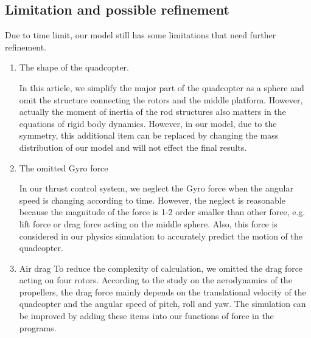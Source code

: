\subsection{Limitation and possible refinement}
    Due to time limit, our model still has some limitations that need further refinement.
\begin{enumerate}
    \item The shape of the quadcopter.
    
    In this article, we simplify the major part of the quadcopter as a sphere and omit the structure connecting the rotors and the middle platform. However, actually the moment of inertia of the rod structures also matters in the equations of rigid body dynamics. However, in our model, due to the symmetry, this additional item can be replaced by changing the mass distribution of our model and will not effect the final results.
    
    \item The omitted Gyro force 
    
    In our thrust control system, we neglect the Gyro force when the angular speed is changing according to time. However, the neglect is reasonable because the magnitude of the force is 1-2 order smaller than other force, e.g. lift force or drag force acting on the middle sphere. Also, this force is considered in our physics simulation to accurately predict the motion of the quadcopter.
    
    \item Air drag
    To reduce the complexity of calculation, we omitted the drag force acting on four rotors. According to the study on the aerodynamics of the propellers\cite{bib1}, the drag force mainly depends on the translational velocity of the quadcopter and the angular speed of pitch, roll and yaw. The simulation can be improved by adding these items into our functions of force in the programs.
    
\end{enumerate}

